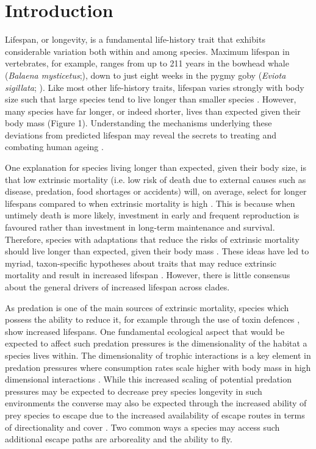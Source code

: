 \section{Introduction}

Lifespan, or longevity, is a fundamental life-history trait that exhibits considerable variation both within and among species. Maximum lifespan in vertebrates, for example, ranges from up to 211 years in the bowhead whale (\textit{Balaena mysticetus};\citep{de2009database}), down to just eight weeks in the pygmy goby (\textit{Eviota sigillata}; \citep{depczynski2005shortest}). Like most other life-history traits, lifespan varies strongly with body size such that large species tend to live longer than smaller species \citep{lindstedt1981body,promislow1993size,de2007analysis,ricklefs2010life}. However, many species have far longer, or indeed shorter, lives than expected given their body mass (Figure 1). Understanding the mechanisms underlying these deviations from predicted lifespan may reveal the secrets to treating and combating human ageing \citep{ricklefs2010insights,zhang2013comparative}. 

One explanation for species living longer than expected, given their body size, is that low extrinsic mortality (i.e. low risk of death due to external causes such as disease, predation, food shortages  or accidents) will, on average, select for longer lifespans compared to when extrinsic mortality is high \citep{stearns1992evolution,Williams1957}. This is because when untimely death is more likely, investment in early and frequent reproduction is favoured rather than investment in long-term maintenance and survival. Therefore, species with adaptations that reduce the risks of extrinsic mortality should live longer than expected, given their body mass \citep{partridge1993optimality}. These ideas have led to myriad, taxon-specific hypotheses about traits that may reduce extrinsic mortality and result in increased lifespan \citep{ricklefs2010insights}. However, there is little consensus about the general drivers of increased lifespan across clades.

As predation is one of the main sources of extrinsic mortality, species which possess the ability to reduce it, for example through the use of toxin defences \citep{hossie2013species}, show increased lifespans. One fundamental ecological aspect that would be expected to affect such predation pressures is the dimensionality of the habitat a species lives within. The dimensionality of trophic interactions is a key element in predation pressures where consumption rates scale higher with body mass in high dimensional interactions \citep{pawar2012dimensionality}. While this increased scaling of potential predation pressures may be expected to decrease prey species longevity in such environments the converse may also be expected through the increased ability of prey species to escape due to the increased availability of escape routes in terms of directionality and cover \citep{moller2010up}. Two common ways a species may access such additional escape paths are arboreality and the ability to fly.

